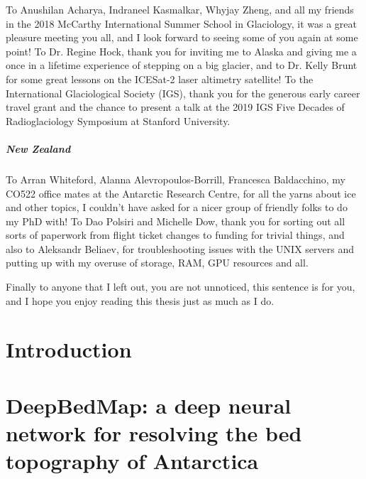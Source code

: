 \documentclass[12pt,twoside]{book}
\begin{document}
\begin{CJK*}{UTF8}{gbsn}
To Anushilan Acharya, Indraneel Kasmalkar, Whyjay Zheng, and all my friends in the 2018 McCarthy International Summer School in Glaciology, it was a great pleasure meeting you all, and I look forward to seeing some of you again at some point!
To Dr. Regine Hock, thank you for inviting me to Alaska and giving me a once in a lifetime experience of stepping on a big glacier, and to Dr. Kelly Brunt for some great lessons on the ICESat-2 laser altimetry satellite!
To the International Glaciological Society (IGS), thank you for the generous early career travel grant and the chance to present a talk at the 2019 IGS Five Decades of Radioglaciology Symposium at Stanford University.

\paragraph{New Zealand}

To Arran Whiteford, Alanna Alevropoulos-Borrill, Francesca Baldacchino, my CO522 office mates at the Antarctic Research Centre, for all the yarns about ice and other topics, I couldn't have asked for a nicer group of friendly folks to do my PhD with!
To Dao Polsiri and Michelle Dow, thank you for sorting out all sorts of paperwork from flight ticket changes to funding for trivial things, and also to Aleksandr Beliaev, for troubleshooting issues with the UNIX servers and putting up with my overuse of storage, RAM, GPU resources and all.

Finally to anyone that I left out, you are not unnoticed, this sentence is for you, and I hope you enjoy reading this thesis just as much as I do.

\end{CJK*}

\tableofcontents
\listoffigures
\listoftables

\printnoidxglossary[type=symbols,sort=use,style=long,title={List of Symbols}]
\printglossary[type=\acronymtype]

\chapter{Introduction}


\chapter{DeepBedMap: a deep neural network for resolving the bed topography of Antarctica}
\label{ch:2}

\end{document}
